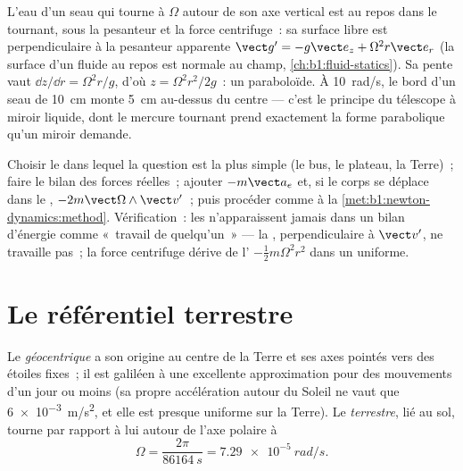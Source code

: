 \begin{example}\label{ex:b1:non-inertial-frames:bucket}
L'eau d'un seau qui tourne à $\Omega$ autour de son axe vertical est au
repos dans le  tournant, sous la pesanteur et la force
centrifuge~: sa surface libre est perpendiculaire à la pesanteur
apparente $\vect g' = -g\vect e_z +
\Omega^2r\vect e_r$ (la surface d'un fluide au repos est normale au
champ, \cref{ch:b1:fluid-statics}). Sa pente vaut
$\dd z/\dd r = \Omega^2r/g$, d'où $z = \Omega^2r^2/2g$~: un paraboloïde.
À \qty{10}{rad/s}, le bord d'un seau de \qty{10}{cm} monte \qty{5}{cm}
au-dessus du centre --- c'est le principe du télescope à miroir liquide,
dont le mercure tournant prend exactement la forme parabolique qu'un
miroir demande.
\end{example}

\begin{method}\label{met:b1:non-inertial-frames:method}
Choisir le  dans lequel la question est la plus simple (le
bus, le plateau, la Terre)~; faire le bilan des forces réelles~; ajouter
$-m\vect a_e$ et, si le corps se déplace dans le ,
$-2m\vect\Omega\wedge\vect v'$~; puis procéder comme à la
\cref{met:b1:newton-dynamics:method}. Vérification~: les  n'apparaissent jamais dans un bilan d'énergie comme «~travail
de quelqu'un~» --- la , perpendiculaire à $\vect v'$, ne
travaille pas~; la force centrifuge dérive de l'
$-\tfrac12 m\Omega^2r^2$ dans un  uniforme.
\end{method}

\section{Le référentiel terrestre}

\begin{definition}\label{def:b1:non-inertial-frames:earth}
Le \emph{ géocentrique} a son origine au centre de la Terre
et ses axes pointés vers des étoiles fixes~; il est galiléen à une
excellente approximation pour des mouvements d'un jour ou moins (sa
propre accélération autour du Soleil ne vaut que \qty{6e-3}{m/s^2}, et
elle est presque uniforme sur la Terre). Le \emph{ terrestre},
lié au sol, tourne par rapport à lui autour de l'axe polaire à
\[
\Omega = \frac{2\pi}{\qty{86164}{s}} = \qty{7.29e-5}{rad/s} .
\]
\end{definition}

